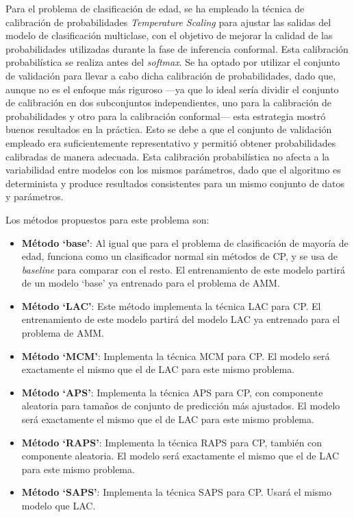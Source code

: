 Para el problema de clasificación de edad, se ha empleado la técnica de calibración de probabilidades \textit{Temperature Scaling} para ajustar las salidas del modelo de clasificación multiclase, con el objetivo de mejorar la calidad de las probabilidades utilizadas durante la fase de inferencia conformal. Esta calibración probabilística se realiza antes del \textit{softmax}. Se ha optado por utilizar el conjunto de validación para llevar a cabo dicha calibración de probabilidades, dado que, aunque no es el enfoque más riguroso ---ya que lo ideal sería dividir el conjunto de calibración en dos subconjuntos independientes, uno para la calibración de probabilidades y otro para la calibración conformal--- esta estrategia mostró buenos resultados en la práctica. Esto se debe a que el conjunto de validación empleado era suficientemente representativo y permitió obtener probabilidades calibradas de manera adecuada. Esta calibración probabilística no afecta a la variabilidad entre modelos con los mismos parámetros, dado que el algoritmo es determinista y produce resultados consistentes para un mismo conjunto de datos y parámetros. 

Los métodos propuestos para este problema son:

\begin{itemize}

    \item \textbf{Método `base'}: Al igual que para el problema de clasificación de mayoría de edad, funciona como un clasificador normal sin métodos de \acrshort{CP}, y se usa de \textit{baseline} para comparar con el resto. El entrenamiento de este modelo partirá de un modelo `base' ya entrenado para el problema de AMM.

    \item \textbf{Método `LAC'}: Este método implementa la técnica LAC para \acrshort{CP}. El entrenamiento de este modelo partirá del modelo \acrshort{LAC} ya entrenado para el problema de AMM.

    \item \textbf{Método `MCM'}: Implementa la técnica \acrshort{MCM} para \acrshort{CP}. El modelo será exactamente el mismo que el de LAC para este mismo problema. 

    \item \textbf{Método `APS'}: Implementa la técnica \acrshort{APS} para \acrshort{CP}, con componente aleatoria para tamaños de conjunto de predicción más ajustados. El modelo será exactamente el mismo que el de LAC para este mismo problema.

    \item \textbf{Método `RAPS'}: Implementa la técnica \acrshort{RAPS} para \acrshort{CP}, también con componente aleatoria. El modelo será exactamente el mismo que el de LAC para este mismo problema. 
    
    \item \textbf{Método `SAPS'}: Implementa la técnica \acrshort{SAPS} para \acrshort{CP}. Usará el mismo modelo que \acrshort{LAC}. 

\end{itemize} 

